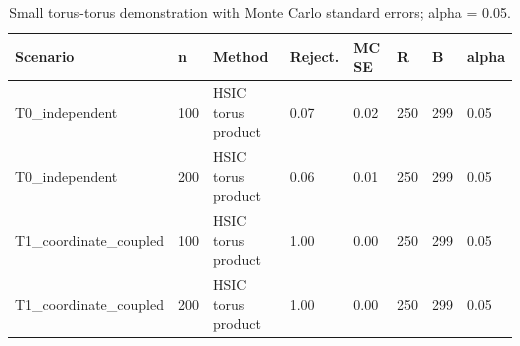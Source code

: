 \begin{table}[!htbp]
\centering
\scriptsize
\caption{Small torus-torus demonstration with Monte Carlo standard errors; alpha = 0.05.}
\label{tab:torus-demo}
\begin{tabular}{llllllll}
\toprule
Scenario & n & Method & Reject. & MC SE & R & B & alpha
\\
\midrule
T0\_independent & 100 & HSIC torus product & 0.07 & 0.02 & 250 & 299 & 0.05\\
T0\_independent & 200 & HSIC torus product & 0.06 & 0.01 & 250 & 299 & 0.05\\
T1\_coordinate\_coupled & 100 & HSIC torus product & 1.00 & 0.00 & 250 & 299 & 0.05\\
T1\_coordinate\_coupled & 200 & HSIC torus product & 1.00 & 0.00 & 250 & 299 & 0.05\\
\bottomrule
\end{tabular}
\end{table}
